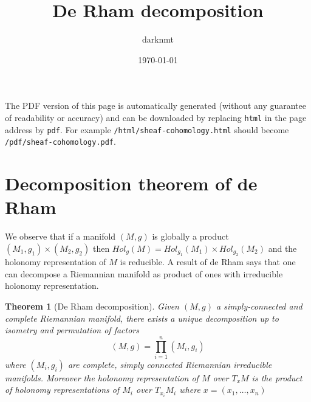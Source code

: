 \documentclass[11pt]{article}
\author{darknmt}
\date{\today}
\title{De Rham decomposition}
\newtheorem{theorem}{Theorem}
\begin{document}
\maketitle
\tableofcontents

\begin{info}
The PDF version of this page is automatically generated (without any guarantee of
readability or accuracy) and can be downloaded by replacing \texttt{html} in the page address by
\texttt{pdf}. 
For example \texttt{/html/sheaf-cohomology.html} should become \texttt{/pdf/sheaf-cohomology.pdf}.
\end{info}

\section{Decomposition theorem of de Rham}
\label{sec:org6744296}

We observe that if a manifold \((M,g)\) is globally a product \((M_1,g_1)\times (M_2,g_2)\) then
\(Hol_{g}(M) = Hol_{g_1}(M_1)\times Hol_{g_2}(M_2)\) and the holonomy representation of \(M\) is
reducible. A result of de Rham says that one can decompose a Riemannian manifold as product of ones
with irreducible holonomy representation.


\begin{theorem}[De Rham decomposition]
\label{orgc11e5b2}
Given \((M,g)\) a simply-connected and complete Riemannian manifold, there exists a unique
decomposition up to isometry and permutation of factors
\[
(M,g) = \prod_{i=1}^n(M_i,g_i)
\]
where \((M_i,g_i)\) are complete, simply connected Riemannian irreducible manifolds. Moreover the
holonomy representation of \(M\) over \(T_xM\) is the product of holonomy representations of \(M_i\) over
\(T_{x_i}M_i\) where \(x = (x_1,\dots, x_n)\)
\end{theorem}
\end{document}
